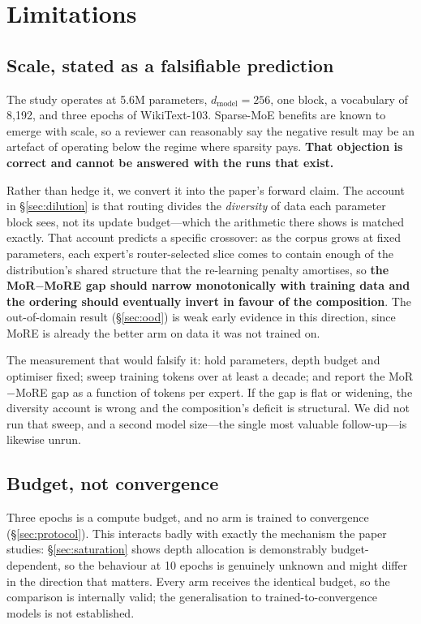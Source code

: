 \section*{Limitations}
\label{sec:limitations}

\subsection*{Scale, stated as a falsifiable prediction}

The study operates at 5.6M parameters, $d_{\text{model}} = 256$, one block, a
vocabulary of 8{,}192, and three epochs of WikiText-103. Sparse-MoE benefits are
known to emerge with scale, so a reviewer can reasonably say the negative result
may be an artefact of operating below the regime where sparsity pays. \textbf{That
objection is correct and cannot be answered with the runs that exist.}

Rather than hedge it, we convert it into the paper's forward claim. The account in
\S\ref{sec:dilution} is that routing divides the \emph{diversity} of data each
parameter block sees, not its update budget---which the arithmetic there shows is
matched exactly. That account predicts a specific crossover: as the corpus grows at
fixed parameters, each expert's router-selected slice comes to contain enough of
the distribution's shared structure that the re-learning penalty amortises, so
\textbf{the MoR$-$MoRE gap should narrow monotonically with training data and the
ordering should eventually invert in favour of the composition}. The out-of-domain
result (\S\ref{sec:ood}) is weak early evidence in this direction, since MoRE is
already the better arm on data it was not trained on.

The measurement that would falsify it: hold parameters, depth budget and optimiser
fixed; sweep training tokens over at least a decade; and report the MoR$-$MoRE gap
as a function of tokens per expert. If the gap is flat or widening, the diversity
account is wrong and the composition's deficit is structural. We did not run that
sweep, and a second model size---the single most valuable follow-up---is likewise
unrun.

\subsection*{Budget, not convergence}

Three epochs is a compute budget, and no arm is trained to convergence
(\S\ref{sec:protocol}). This interacts badly with exactly the mechanism the paper
studies: \S\ref{sec:saturation} shows depth allocation is demonstrably
budget-dependent, so the behaviour at 10 epochs is genuinely unknown and might
differ in the direction that matters. Every arm receives the identical budget, so
the comparison is internally valid; the generalisation to trained-to-convergence
models is not established.

